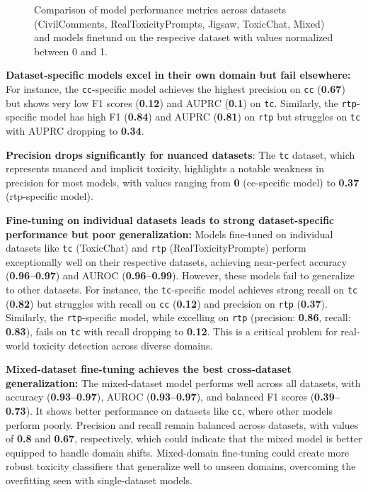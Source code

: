 \begin{figure}[ht]
    \centering
    
    \caption{Comparison of model performance metrics across datasets (CivilComments, RealToxicityPrompts, Jigsaw, ToxicChat, Mixed) and models finetund on the respecive dataset with values normalized between 0 and 1.}
    \label{fig:heatmaps}
\end{figure}

\textbf{Dataset-specific models excel in their own domain but fail elsewhere:} For instance, the \texttt{cc}-specific model achieves the highest precision on \texttt{cc} (\textbf{0.67}) but shows very low F1 scores (\textbf{0.12}) and AUPRC (\textbf{0.1}) on \texttt{tc}. Similarly, the \texttt{rtp}-specific model has high F1 (\textbf{0.84}) and AUPRC (\textbf{0.81}) on \texttt{rtp} but struggles on \texttt{tc} with AUPRC dropping to \textbf{0.34}.

\textbf{Precision drops significantly for nuanced datasets}: The \texttt{tc} dataset, which represents nuanced and implicit toxicity, highlights a notable weakness in precision for most models, with values ranging from \textbf{0} (cc-specific model) to \textbf{0.37} (rtp-specific model).

\textbf{Fine-tuning on individual datasets leads to strong dataset-specific performance but poor generalization:}  
Models fine-tuned on individual datasets like \texttt{tc} (ToxicChat) and \texttt{rtp} (RealToxicityPrompts) perform exceptionally well on their respective datasets, achieving near-perfect accuracy (\textbf{0.96–0.97}) and AUROC (\textbf{0.96–0.99}). However, these models fail to generalize to other datasets. For instance, the \texttt{tc}-specific model achieves strong recall on \texttt{tc} (\textbf{0.82}) but struggles with recall on \texttt{cc} (\textbf{0.12}) and precision on \texttt{rtp} (\textbf{0.37}). Similarly, the \texttt{rtp}-specific model, while excelling on \texttt{rtp} (precision: \textbf{0.86}, recall: \textbf{0.83}), fails on \texttt{tc} with recall dropping to \textbf{0.12}. This is a critical problem for real-world toxicity detection across diverse domains.

\textbf{Mixed-dataset fine-tuning achieves the best cross-dataset generalization:}  
The mixed-dataset model performs well across all datasets, with accuracy (\textbf{0.93–0.97}), AUROC (\textbf{0.93–0.97}), and balanced F1 scores (\textbf{0.39–0.73}). It shows better performance on datasets like \texttt{cc}, where other models perform poorly. Precision and recall remain balanced across datasets, with values of \textbf{0.8} and \textbf{0.67}, respectively, which could indicate that the mixed model is better equipped to handle domain shifts. Mixed-domain fine-tuning could create more robust toxicity classifiers that generalize well to unseen domains, overcoming the overfitting seen with single-dataset models.

